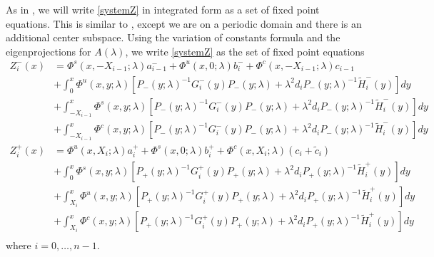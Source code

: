 \documentclass[thesis.tex]{subfiles}
\begin{document}
As in \cite{Sandstede1998}, we will write \eqref{systemZ} in integrated form as a set of fixed point equations. This is similar to \cite[(3.14)]{Sandstede1998}, except we are on a periodic domain and there is an additional center subspace. Using the variation of constants formula and the eigenprojections for $A(\lambda)$, we write \eqref{systemZ} as the set of fixed point equations
\begin{equation}\label{Zfpeq}
\begin{aligned}
Z_i^-(x) &= \Phi^s(x, -X_{i-1}; \lambda) a_{i-1}^- + \Phi^u(x, 0; \lambda) b_i^- + \Phi^c(x, -X_{i-1}; \lambda) c_{i-1} \\
&+ \int_0^x \Phi^u(x, y; \lambda)[P_-(y; \lambda)^{-1} G_i^-(y) P_-(y; \lambda) + \lambda^2 d_i P_-(y; \lambda)^{-1} \tilde{H}_i^-(y)] dy \\
&+ \int_{-X_{i-1}}^x \Phi^s(x, y; \lambda)[P_-(y; \lambda)^{-1} G_i^-(y) P_-(y; \lambda) + \lambda^2 d_i P_-(y; \lambda)^{-1} \tilde{H}_i^-(y)] dy \\
&+ \int_{-X_{i-1}}^x \Phi^c(x, y; \lambda) [P_-(y; \lambda)^{-1} G_i^-(y) P_-(y; \lambda) + \lambda^2 d_i P_-(y; \lambda)^{-1} \tilde{H}_i^-(y)] dy  \\ 
Z_i^+(x) &= \Phi^u(x, X_i; \lambda) a_i^+ + \Phi^s(x, 0; \lambda) b_i^+ + \Phi^c(x, X_i; \lambda)(c_i + \tilde{c}_i) \\
&+ \int_0^x \Phi^s(x, y; \lambda) [P_+(y; \lambda)^{-1} G_i^+(y) P_+(y; \lambda) + \lambda^2 d_i P_+(y; \lambda)^{-1} \tilde{H}_i^+(y)] dy \\
&+ \int_{X_i}^x \Phi^u(x, y; \lambda) [P_+(y; \lambda)^{-1} G_i^+(y) P_+(y; \lambda) + \lambda^2 d_i P_+(y; \lambda)^{-1} \tilde{H}_i^+(y)] dy \\
&+ \int_{X_i}^x \Phi^c(x, y; \lambda) [P_+(y; \lambda)^{-1} G_i^+(y) P_+(y; \lambda) + \lambda^2 d_i P_+(y; \lambda)^{-1} \tilde{H}_i^+(y)] dy \\
\end{aligned}
\end{equation}
where $i = 0, \dots, n-1$. 
\end{document}
